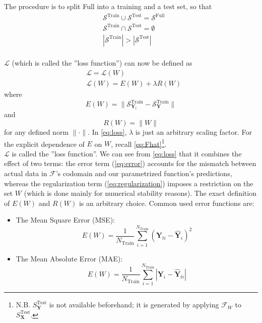 The procedure is to split Full into a training and a test set, so that
\begin{align}
	& \mathcal{S}^\text{Train} \cup \mathcal{S}^\text{Test} = \mathcal{S}^\text{Full} \\
	& \mathcal{S}^\text{Train} \cap \mathcal{S}^\text{Test} = \emptyset \\
	& |\mathcal{S}^\text{Train}| > |\mathcal{S}^\text{Test}|
\end{align}\\
%
$\mathcal{L}$ (which is called the ''loss function'') can now be defined as
\begin{align}
	& \mathcal{L}=\mathcal{L}(W) \\
	& \mathcal{L}(W)=E(W)+\lambda R(W) \label{eq:loss}
\end{align}
where
\begin{equation}\label{eq:error}
	E(W) = \|\mathcal{S}^\text{Train}_{\mathbf{Y}_t} - \mathcal{S}^\text{Train}_\mathbf{{Y}}\|
\end{equation}
and
\begin{equation}\label{eq:regularization}
	R(W) = \|W\|
\end{equation}
for any defined norm $\|\cdot\|$. In \cref{eq:loss}, $\lambda$ is just an arbitrary scaling factor. For the explicit dependence of $E$ on $W$, recall \cref{eq:Fhat}\footnote{N.B. $S^\text{Test}_{\mathbf{{Y}}}$ is not available beforehand; it is generated by applying $\mathcal{{F}}_W$ to $S^\text{Test}_{\mathbf{X}}$.}.\\
%
\indent $\mathcal{L}$ is called the ''loss function''. We can see from \cref{eq:loss} that it combines the effect of two terms: the error term (\cref{eq:error}) accounts for the mismatch between actual data in $\mathcal{F}$'s codomain and our parametrized function's predictions, whereas the regularization term (\cref{eq:regularization}) imposes a restriction on the set $W$ (which is done mainly for numerical stability reasons). The exact definition of $E(W)$ and $R(W)$ is an arbitrary choice. Common used error functions are:
\begin{itemize}
	\item The Mean Square Error (MSE):
	\begin{equation}\label{eq:mse}
		E(W) = \frac{1}{N_{\text{Train}}} \sum_{i=1}^{N_{\text{Train}}} (\mathbf{Y}_{ti} - \mathbf{\hat{Y}}_i)^2
	\end{equation}
	\item The Mean Absolute Error (MAE):
	\begin{equation}\label{eq:mae}
		E(W) = \frac{1}{N_{\text{Train}}} \sum_{i=1}^{N_{\text{Train}}} \left|\mathbf{Y}_i - \mathbf{\hat{Y}}_{ti}\right|
	\end{equation}
\end{itemize}

